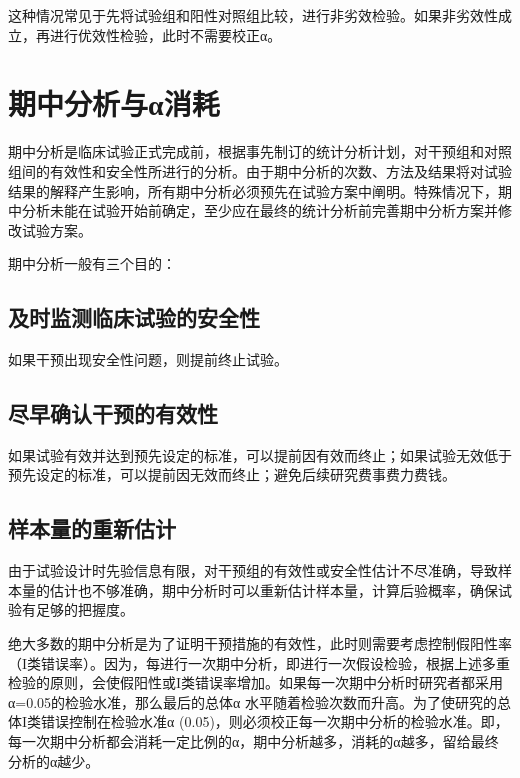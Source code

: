\documentclass[
  chinese-hans,
  letterpaper,
  DIV=11,
  numbers=noendperiod]{scrreprt}
\begin{document}
这种情况常见于先将试验组和阳性对照组比较，进行非劣效检验。如果非劣效性成立，再进行优效性检验，此时不需要校正α。

\section{期中分析与α消耗}\label{ux671fux4e2dux5206ux6790ux4e0eux3b1ux6d88ux8017}

期中分析是临床试验正式完成前，根据事先制订的统计分析计划，对干预组和对照组间的有效性和安全性所进行的分析。由于期中分析的次数、方法及结果将对试验结果的解释产生影响，所有期中分析必须预先在试验方案中阐明。特殊情况下，期中分析未能在试验开始前确定，至少应在最终的统计分析前完善期中分析方案并修改试验方案。

期中分析一般有三个目的：

\subsection{及时监测临床试验的安全性}\label{ux53caux65f6ux76d1ux6d4bux4e34ux5e8aux8bd5ux9a8cux7684ux5b89ux5168ux6027}

如果干预出现安全性问题，则提前终止试验。

\subsection{尽早确认干预的有效性}\label{ux5c3dux65e9ux786eux8ba4ux5e72ux9884ux7684ux6709ux6548ux6027}

如果试验有效并达到预先设定的标准，可以提前因有效而终止；如果试验无效低于预先设定的标准，可以提前因无效而终止；避免后续研究费事费力费钱。

\subsection{样本量的重新估计}\label{ux6837ux672cux91cfux7684ux91cdux65b0ux4f30ux8ba1}

由于试验设计时先验信息有限，对干预组的有效性或安全性估计不尽准确，导致样本量的估计也不够准确，期中分析时可以重新估计样本量，计算后验概率，确保试验有足够的把握度。

绝大多数的期中分析是为了证明干预措施的有效性，此时则需要考虑控制假阳性率（I类错误率）。因为，每进行一次期中分析，即进行一次假设检验，根据上述多重检验的原则，会使假阳性或I类错误率增加。如果每一次期中分析时研究者都采用α=0.05的检验水准，那么最后的总体α
水平随着检验次数而升高。为了使研究的总体I类错误控制在检验水准α
(0.05)，则必须校正每一次期中分析的检验水准。即，每一次期中分析都会消耗一定比例的α，期中分析越多，消耗的α越多，留给最终分析的α越少。
\end{document}
